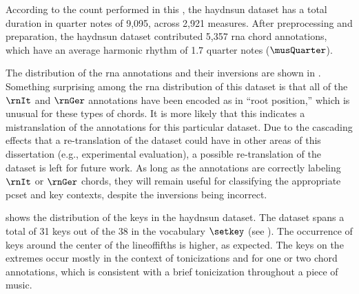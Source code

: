 
According to the count performed in this \thesisdiss{}, the
\gls{haydnsun} dataset has a total duration in quarter notes
of 9,095, across 2,921 measures. After preprocessing and
preparation, the \gls{haydnsun} dataset contributed 5,357
\gls{rna} chord annotations, which have an average harmonic
rhythm of 1.7 quarter notes ($\musQuarter$).

The distribution of the \gls{rna} annotations and their
inversions are shown in .
Something surprising among the \gls{rna} distribution of
this dataset is that all of the $\rnIt$ and $\rnGer$
annotations have been encoded as in ``root position,'' which
is unusual for these types of chords. It is more likely that
this indicates a mistranslation of the annotations for this
particular dataset. Due to the cascading effects that a
re-translation of the dataset could have in other areas of
this dissertation (e.g., experimental evaluation), a
possible re-translation of the dataset is left for future
work. As long as the annotations are correctly labeling
$\rnIt$ or $\rnGer$ chords, they will remain useful for
classifying the appropriate \gls{pcset} and key contexts,
despite the inversions being incorrect.



 shows the distribution of the
keys in the \gls{haydnsun} dataset. The dataset spans a
total of 31 keys out of the 38 in the vocabulary $\setkey$
(see ). The occurrence of
keys around the center of the \gls{lineoffifths} is higher,
as expected. The keys on the extremes occur mostly in the
context of tonicizations and for one or two chord
annotations, which is consistent with a brief tonicization
throughout a piece of music.
